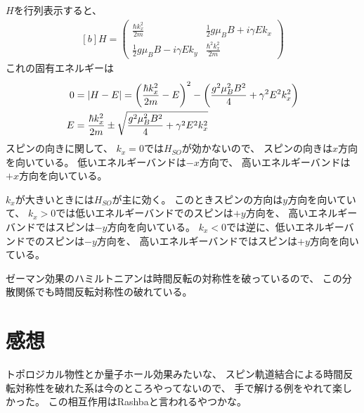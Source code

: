 \documentclass[../ap_2014.tex]{subfiles}
\begin{document}
\subsection{}
\(H\)を行列表示すると、
\begin{equation}\begin{aligned}[b]
    H = \begin{pmatrix}
        \frac{\hbar k_x^2}{2m} & \frac{1}{2}g\mu_BB+i\gamma Ek_x\\
        \frac{1}{2}g\mu_BB-i\gamma Ek_y & \frac{\hbar^2k_x^2}{2m}
    \end{pmatrix}
\end{aligned}\end{equation}
これの固有エネルギーは
\begin{equation}\begin{aligned}[b]
    0 &= \abs{H-E} = \qty(\frac{\hbar k_x^2}{2m}-E)^2-\qty(\frac{g^2\mu_B^2B^2}{4}+\gamma^2 E^2k_x^2)\\
    E &= \frac{\hbar k_x^2}{2m}\pm\sqrt{\frac{g^2\mu_B^2B^2}{4}+\gamma^2 E^2k_x^2}
\end{aligned}\end{equation}
スピンの向きに関して、
\(k_x=0\)では\(H_{SO}\)が効かないので、
スピンの向きは\(x\)方向を向いている。
低いエネルギーバンドは\(-x\)方向で、
高いエネルギーバンドは\(+x\)方向を向いている。

\(k_x\)が大きいときには\(H_{SO}\)が主に効く。
このときスピンの方向は\(y\)方向を向いていて、
\(k_x>0\)では低いエネルギーバンドでのスピンは\(+y\)方向を、
高いエネルギーバンドではスピンは\(-y\)方向を向いている。
\(k_x<0\)では逆に、低いエネルギーバンドでのスピンは\(-y\)方向を、
高いエネルギーバンドではスピンは\(+y\)方向を向いている。

ゼーマン効果のハミルトニアンは時間反転の対称性を破っているので、
この分散関係でも時間反転対称性の破れている。

\begin{figure}[h]
    \centering
\end{figure}

\section*{感想}
トポロジカル物性とか量子ホール効果みたいな、
スピン軌道結合による時間反転対称性を破れた系は今のところやってないので、
手で解ける例をやれて楽しかった。
この相互作用はRashbaと言われるやつかな。
\end{document}
